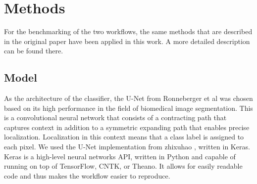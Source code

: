 \section{Methods}\label{sec:methods}
For the benchmarking of the two workflows, the same methods that are described in the original paper have been applied in this work.
A more detailed description can be found there.

\begin{sansmath}
\end{sansmath}

\begin{sansmath}
\end{sansmath}

\subsection{Model}
As the architecture of the classifier, the U-Net from Ronneberger et al \cite{ronneberger_u-net:_2015} was chosen based on its high performance in the field of biomedical image segmentation.
This is a convolutional neural network that consists of a contracting path that captures context in addition to a symmetric expanding path that enables precise localization.
Localization in this context means that a class label is assigned to each pixel.
We used the U-Net implementation from zhixuhao \cite{zhixuhao_zhixuhao/unet_2020}, written in Keras.
Keras is a high-level neural networks API, written in Python and capable of running on top of TensorFlow, CNTK, or Theano.
It allows for easily readable code and thus makes the workflow easier to reproduce.

